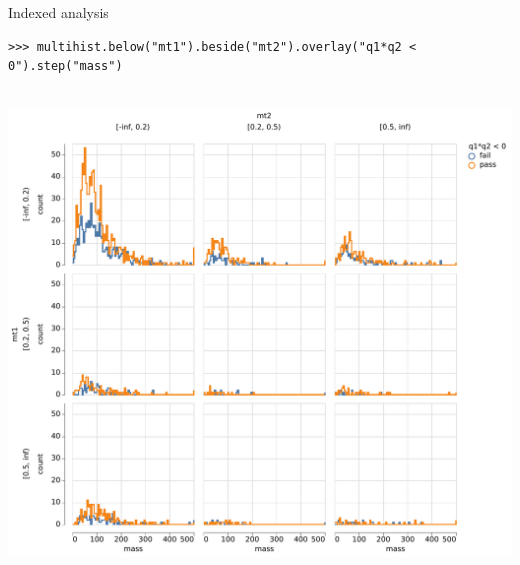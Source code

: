 \documentclass[aspectratio=169]{beamer}
\begin{document}
\begin{frame}[fragile]{Indexed analysis}
\begin{onlyenv}
\begin{verbatim}
>>> multihist.below("mt1").beside("mt2").overlay("q1*q2 < 0").step("mass")
\end{verbatim}
\mbox{ } \hfill \includegraphics[height=6 cm]{pandhist_double_trellis_overlay.pdf} \hfill \mbox{ }
\end{onlyenv}
\end{frame}
\end{document}
